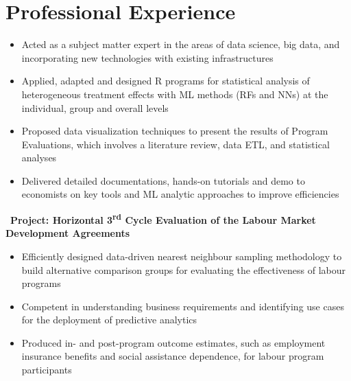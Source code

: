 \documentclass[12pt,a4paper,roman]{moderncv}        %
\begin{document}
\section{Professional Experience}
\begin{itemize}
    \item Acted as a subject matter expert in the areas of data science, big data, and incorporating new technologies with existing infrastructures
    \item Applied, adapted and designed R programs for statistical analysis of heterogeneous treatment effects with ML methods (RFs and NNs) at the individual, group and overall levels
    \item Proposed data visualization techniques to present the results of Program Evaluations, which involves a literature review, data ETL, and statistical analyses
    \item Delivered detailed documentations, hands-on tutorials and demo to economists on key tools and ML analytic approaches to improve efficiencies
\end{itemize}

\bigskip

\faBook \, \textbf{Project: Horizontal 3\textsuperscript{rd} Cycle Evaluation of the Labour Market Development Agreements}
\begin{itemize}%
        \item Efficiently designed data-driven nearest neighbour sampling methodology to build alternative comparison groups for evaluating the effectiveness of labour programs
        \item Competent in understanding business requirements and identifying use cases for the deployment of predictive analytics
        \item Produced in- and post-program outcome estimates, such as employment insurance benefits and social assistance dependence, for labour program participants
\end{itemize}
\bigskip
\end{document}
